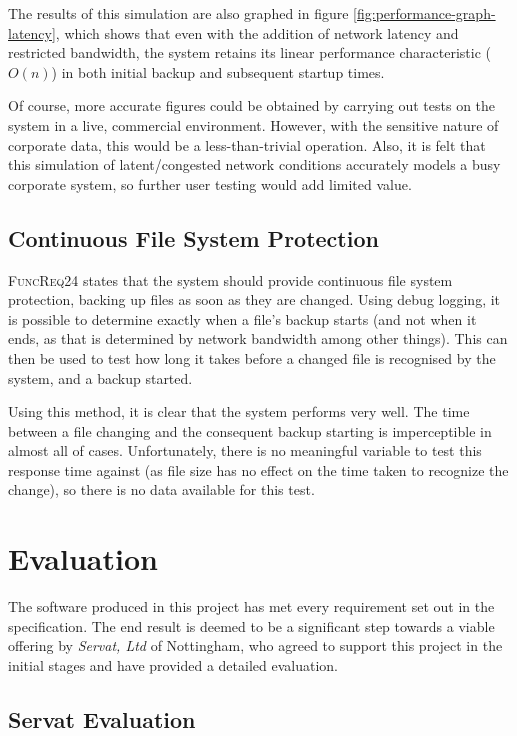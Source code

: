 The results of this simulation are also graphed in figure
\ref{fig:performance-graph-latency}, which shows that even with the addition of
network latency and restricted bandwidth, the system retains its linear
performance characteristic ($O(n)$) in both initial backup and subsequent
startup times.

Of course, more accurate figures could be obtained by carrying out tests on the
system in a live, commercial environment. However, with the sensitive nature of
corporate data, this would be a less-than-trivial operation. Also, it is felt
that this simulation of latent/congested network conditions accurately models
a busy corporate system, so further user testing would add limited value.

\subsection{Continuous File System Protection}

\textsc{FuncReq24} states that the system should provide continuous file system
protection, backing up files as soon as they are changed. Using debug logging,
it is possible to determine exactly when a file's backup starts (and not when
it ends, as that is determined by network bandwidth among other things). This
can then be used to test how long it takes before a changed file is recognised
by the system, and a backup started.

Using this method, it is clear that the system performs very well. The time
between a file changing and the consequent backup starting is imperceptible in
almost all of cases. Unfortunately, there is no meaningful variable to test
this response time against (as file size has no effect on the time taken to
recognize the change), so there is no data available for this test.

\newpage

\section{Evaluation}

The software produced in this project has met every requirement set out in the
specification. The end result is deemed to be a significant step towards
a viable offering by \emph{Servat, Ltd} of Nottingham, who agreed to support
this project in the initial stages and have provided a detailed evaluation.

\subsection{Servat Evaluation}

